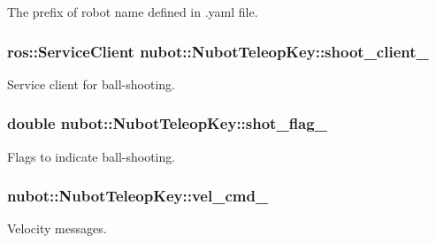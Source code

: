 The prefix of robot name defined in .yaml file. 

\hypertarget{classnubot_1_1NubotTeleopKey_a944cfba55efc7f7ef7ed9acd17c7f676}{
\subsubsection[{shoot\-\_\-client\-\_\-}]{\setlength{\rightskip}{0pt plus 5cm}ros\-::\-Service\-Client nubot\-::\-Nubot\-Teleop\-Key\-::shoot\-\_\-client\-\_\-}}\label{classnubot_1_1NubotTeleopKey_a944cfba55efc7f7ef7ed9acd17c7f676}


Service client for ball-\/shooting. 

\hypertarget{classnubot_1_1NubotTeleopKey_a90a481a3a66e64083a27945def47f4ae}{
\subsubsection[{shot\-\_\-flag\-\_\-}]{\setlength{\rightskip}{0pt plus 5cm}double nubot\-::\-Nubot\-Teleop\-Key\-::shot\-\_\-flag\-\_\-\hspace{0.3cm}{\ttfamily [private]}}}\label{classnubot_1_1NubotTeleopKey_a90a481a3a66e64083a27945def47f4ae}


Flags to indicate ball-\/shooting. 

\hypertarget{classnubot_1_1NubotTeleopKey_a7c70e3f5f30f940e9c508deb84f23da5}{
\subsubsection[{vel\-\_\-cmd\-\_\-}]{ nubot\-::\-Nubot\-Teleop\-Key\-::vel\-\_\-cmd\-\_\-\hspace{0.3cm}{\ttfamily [private]}}}\label{classnubot_1_1NubotTeleopKey_a7c70e3f5f30f940e9c508deb84f23da5}


Velocity messages. 

